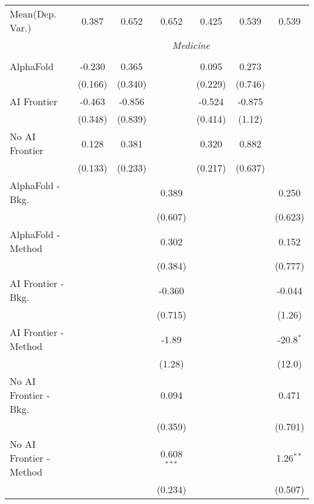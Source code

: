 \begin{tabular}{lcccccc}
Mean(Dep. Var.) & 0.387 & 0.652 & 0.652 & 0.425 & 0.539 & 0.539 \\
 & \multicolumn{6}{c}{\textit{Medicine}} \\ \\
   AlphaFold               & -0.230  & 0.365   &               & 0.095   & 0.273   &   \\   
                           & (0.166) & (0.340) &               & (0.229) & (0.746) &   \\   
   AI Frontier             & -0.463  & -0.856  &               & -0.524  & -0.875  &   \\   
                           & (0.348) & (0.839) &               & (0.414) & (1.12)  &   \\   
   No AI Frontier          & 0.128   & 0.381   &               & 0.320   & 0.882   &   \\   
                           & (0.133) & (0.233) &               & (0.217) & (0.637) &   \\   
   AlphaFold - Bkg.        &         &         & 0.389         &         &         & 0.250\\   
                           &         &         & (0.607)       &         &         & (0.623)\\   
   AlphaFold - Method      &         &         & 0.302         &         &         & 0.152\\   
                           &         &         & (0.384)       &         &         & (0.777)\\   
   AI Frontier - Bkg.      &         &         & -0.360        &         &         & -0.044\\   
                           &         &         & (0.715)       &         &         & (1.26)\\   
   AI Frontier - Method    &         &         & -1.89         &         &         & -20.8$^{*}$\\   
                           &         &         & (1.28)        &         &         & (12.0)\\   
   No AI Frontier - Bkg.   &         &         & 0.094         &         &         & 0.471\\   
                           &         &         & (0.359)       &         &         & (0.701)\\   
   No AI Frontier - Method &         &         & 0.608$^{***}$ &         &         & 1.26$^{**}$\\   
                           &         &         & (0.234)       &         &         & (0.507)\\   

\end{tabular}
